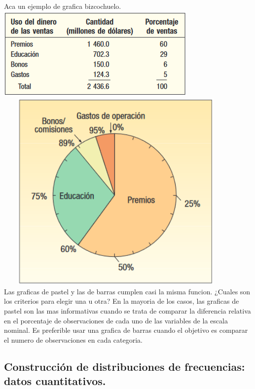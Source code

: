 \documentclass[]{article}
\begin{document}
Aca un ejemplo de grafica bizcochuelo.\\
\includegraphics{tablaFrecuenciasRelativas2_2.PNG}\\
\includegraphics[width=12cm, height=10cm]{graficoPastel2_2.png} \\
Las graficas de pastel y las de barras cumplen casi la misma funcion. ¿Cuales son los criterios para elegir una u otra? En la mayoria de los casos, las graficas de pastel son las mas informativas cuando se trata de comparar la diferencia relativa en el porcentaje de observaciones de cada uno de las variables de la escala nominal. Es preferible usar una grafica de barras cuando el objetivo es comparar el numero de observaciones en cada categoria.
\subsection{Construcción de distribuciones de frecuencias: datos cuantitativos.}
\end{document}

